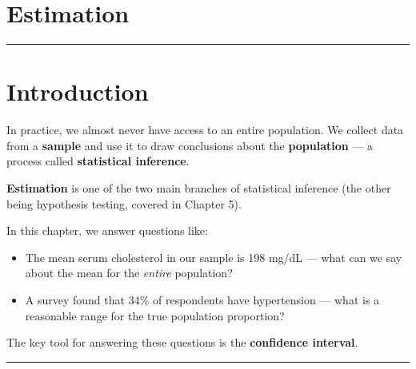 \documentclass[
  12pt,
  letterpaper,
]{book}
\providecommand{\tightlist}{%
  \setlength{\itemsep}{0pt}\setlength{\parskip}{0pt}}
\begin{document}
\chapter{Estimation}\label{estimation}

\begin{center}\rule{0.5\linewidth}{0.5pt}\end{center}


\chapter*{Introduction}\label{introduction-3}


\begin{tcolorbox}[enhanced jigsaw, arc=.35mm, bottomrule=.15mm, bottomtitle=1mm, breakable, colback=white, colbacktitle=quarto-callout-note-color!10!white, colframe=quarto-callout-note-color-frame, coltitle=black, left=2mm, leftrule=.75mm, opacityback=0, opacitybacktitle=0.6, rightrule=.15mm, title={💡 Why Does This Matter?}, titlerule=0mm, toprule=.15mm, toptitle=1mm]

In practice, we almost never have access to an entire population. We
collect data from a \textbf{sample} and use it to draw conclusions about
the \textbf{population} --- a process called \textbf{statistical
inference}.

\textbf{Estimation} is one of the two main branches of statistical
inference (the other being hypothesis testing, covered in Chapter 5).

In this chapter, we answer questions like:

\begin{itemize}
\tightlist
\item
  The mean serum cholesterol in our sample is 198 mg/dL --- what can we
  say about the mean for the \emph{entire} population?
\item
  A survey found that 34\% of respondents have hypertension --- what is
  a reasonable range for the true population proportion?
\end{itemize}

The key tool for answering these questions is the \textbf{confidence
interval}.

\end{tcolorbox}

\begin{center}\rule{0.5\linewidth}{0.5pt}\end{center}
\end{document}
